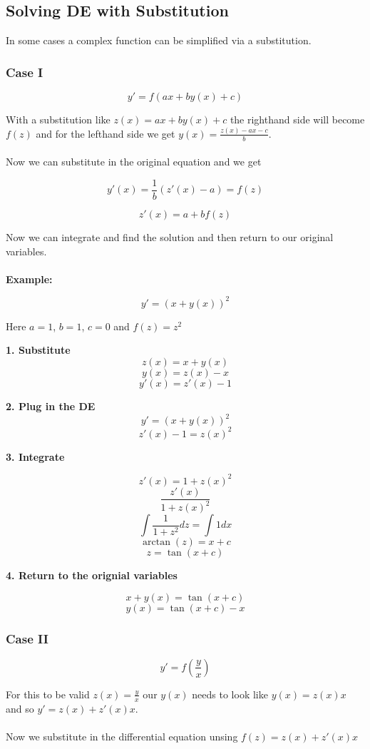 \subsection{Solving DE with Substitution}

In some cases a complex function can be simplified via a substitution.

\subsubsection{Case I}

\[y' = f(ax + by(x) + c)\]

With a substitution like \(z(x) = ax + by(x) + c\) the righthand side will become \(f(z)\)
and for the lefthand side we get \(y(x) = \frac{z(x) - ax - c}{b}\).
\\\\
Now we can substitute in the original equation and we get

\[y'(x) = \frac{1}{b} (z'(x) - a) = f(z)\]

\[z'(x) = a + b f(z)\]

Now we can integrate and find the solution and then return to our original variables.
\\\\
\textbf{Example:}

\[y' = (x + y(x))^2\]

Here \(a = 1\), \(b = 1\), \(c = 0\) and \(f(z) = z^2\)

\textbf{1. Substitute}
\[
z(x) = x + y(x)
\]
\[y(x) = z(x) - x\]
\[y'(x) = z'(x) - 1\]

\textbf{2. Plug in the DE}
\[y' = (x + y(x))^2\]
\[z'(x) - 1 = z(x)^2\]

\textbf{3. Integrate}

\[z'(x) = 1 + z(x)^2\]
\[\frac{z'(x)}{1 + z(x)^2}\]
\[\int \frac{1}{1 + z^2} dz = \int 1 dx\]
\[\arctan (z) = x + c\]
\[z = \tan(x + c)\]

\textbf{4. Return to the orignial variables}

\[x + y(x) = \tan(x + c)\]
\[y(x) = \tan(x + c) - x\]

\subsubsection{Case II}

\[y' = f(\frac{y}{x})\]

For this to be valid \(z(x) = \frac{y}{x}\) our \(y(x)\) needs to look like \(y(x) = z(x)x\) and so \(y' = z(x) + z'(x)x\).
\\\\
Now we substitute in the differential equation unsing \(f(z) = z(x) + z'(x)x\)

